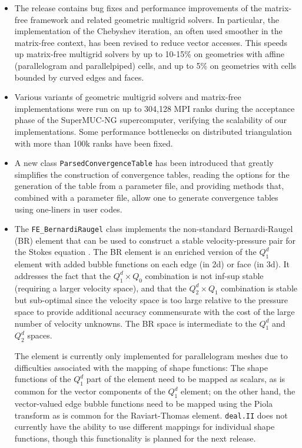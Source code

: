 \documentclass{ansarticle-preprint}
\newcommand{\specialword}[1]{\texttt{#1}}
\newcommand{\dealii}{{\specialword{deal.II}}\xspace}
\begin{document}
\begin{itemize}
\item
  The release contains bug fixes and performance improvements of the
  matrix-free framework and related geometric multigrid solvers. In
  particular, the implementation of the Chebyshev iteration, an often used
  smoother in the matrix-free context, has been revised to reduce vector
  accesses. This speeds up matrix-free multigrid solvers by up to 10-15\%
  on geometries with affine (parallelogram and parallelpiped) cells, and up
  to 5\% on geometries with cells bounded by curved edges and faces.

\item
  Various variants of geometric multigrid solvers and matrix-free
  implementations were run on up to 304,128 MPI ranks during the acceptance
  phase of the SuperMUC-NG supercomputer, verifying the scalability of our
  implementations. Some performance bottlenecks on distributed
  triangulation with more than 100k ranks have been fixed.

\item A new class \texttt{ParsedConvergenceTable} has been introduced
  that greatly simplifies the construction of convergence tables,
  reading the options for the generation of the table from a parameter
  file, and providing methods that, combined with a parameter file,
  allow one to generate convergence tables using one-liners in user
  codes.

\item
  The \texttt{FE\_BernardiRaugel} class implements the non-standard
  Bernardi-Raugel (BR) element that can be used to construct a stable
  velocity-pressure pair for the Stokes equation \cite{BR85}. The BR
  element is an enriched version of the $Q_1^d$ element with added bubble
  functions on each edge (in 2d) or face (in 3d). It addresses the fact
  that the $Q_1^d\times Q_0$ combination is not inf-sup stable (requiring a
  larger velocity space), and that the $Q_2^d\times Q_1$ combination is
  stable but sub-optimal since the velocity space is too large relative to
  the pressure space to provide additional accuracy commensurate with the
  cost of the large number of velocity unknowns. The BR space is
  intermediate to the $Q_1^d$ and $Q_2^d$ spaces.

  The element is currently only implemented for parallelogram meshes due to
  difficulties associated with the mapping of shape functions: The shape
  functions of the $Q_1^d$ part of the element need to be mapped as
  scalars, as is common for the vector components of the $Q_1^d$ element;
  on the other hand, the vector-valued edge bubble functions need to be
  mapped using the Piola transform as is common for the Raviart-Thomas
  element. \dealii{} does not currently have the ability to use different
  mappings for individual shape functions, though this functionality is
  planned for the next release.


\end{itemize}
\end{document}
